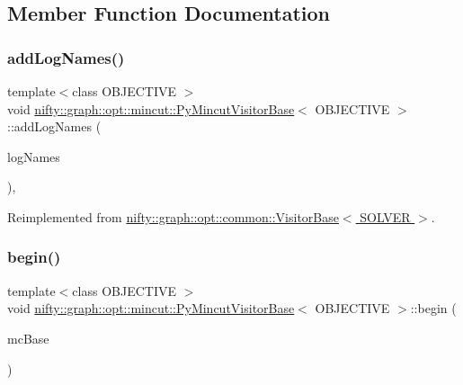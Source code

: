 \subsection{Member Function Documentation}
\mbox{\label{classnifty_1_1graph_1_1opt_1_1mincut_1_1PyMincutVisitorBase_a99c335cf50430f381e66e826f6805e5b}} 
\subsubsection{\texorpdfstring{add\+Log\+Names()}{addLogNames()}}
{\footnotesize\ttfamily template$<$class O\+B\+J\+E\+C\+T\+I\+VE $>$ \\
void \hyperlink{classnifty_1_1graph_1_1opt_1_1mincut_1_1PyMincutVisitorBase}{nifty\+::graph\+::opt\+::mincut\+::\+Py\+Mincut\+Visitor\+Base}$<$ O\+B\+J\+E\+C\+T\+I\+VE $>$\+::add\+Log\+Names (\begin{DoxyParamCaption}\item[{std\+::initializer\+\_\+list$<$ std\+::string $>$}]{log\+Names }\end{DoxyParamCaption})\hspace{0.3cm}{\ttfamily [inline]}, {\ttfamily [virtual]}}



Reimplemented from \hyperlink{classnifty_1_1graph_1_1opt_1_1common_1_1VisitorBase_acc4f1b419303965b0313ca83c6a7a420}{nifty\+::graph\+::opt\+::common\+::\+Visitor\+Base$<$ S\+O\+L\+V\+E\+R $>$}.

\mbox{\label{classnifty_1_1graph_1_1opt_1_1mincut_1_1PyMincutVisitorBase_a92bcd3baab1b60f3c50e9e8723b0b562}} 
\subsubsection{\texorpdfstring{begin()}{begin()}}
{\footnotesize\ttfamily template$<$class O\+B\+J\+E\+C\+T\+I\+VE $>$ \\
void \hyperlink{classnifty_1_1graph_1_1opt_1_1mincut_1_1PyMincutVisitorBase}{nifty\+::graph\+::opt\+::mincut\+::\+Py\+Mincut\+Visitor\+Base}$<$ O\+B\+J\+E\+C\+T\+I\+VE $>$\+::begin (\begin{DoxyParamCaption}\item[{\hyperlink{classnifty_1_1graph_1_1opt_1_1mincut_1_1PyMincutVisitorBase_affe563abecb7aced8bf1b0a273bf61b1}{Mc\+Base} $\ast$}]{mc\+Base }\end{DoxyParamCaption})\hspace{0.3cm}{\ttfamily [inline]}}

